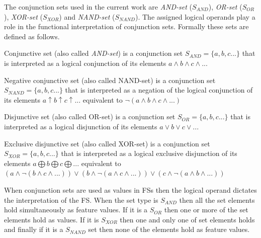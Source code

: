     The conjunction sets used in the current work are \textit{AND-set} ($S_{AND}$), \textit{OR-set} ($S_{OR}$), \textit{XOR-set} ($S_{XOR}$) and \textit{NAND-set} ($S_{NAND}$). The assigned logical operands play a role in the functional interpretation of conjunction sets. %
    Formally these sets are defined as follows.

    \begin{definition}\label{def:and-set}
      Conjunctive set (also called \textit{AND-set}) is a conjunction set $S_{AND}=\{a,b,c...\}$ that is interpreted as a logical conjunction of its elements $a \wedge b \wedge c \wedge ...$ 
    \end{definition}

    \begin{definition}\label{def:nand-set}
    	Negative conjunctive set (also called NAND-set) is a conjunction set $S_{NAND}=\{a,b,c...\}$ that is interpreted as a negation of the logical conjunction of its elements $a \uparrow b \uparrow c \uparrow ...$ equivalent to $ \neg(a \wedge b \wedge c \wedge ...)$ 
    \end{definition}

    \begin{definition}\label{def:or-set}
    	Disjunctive set (also called OR-set) is a conjunction set $S_{OR}=\{a,b,c...\}$ that is interpreted as a logical disjunction of its elements $a \vee b \vee c \vee ...$
    \end{definition}

    \begin{definition}\label{def:xor-set}
    	Exclusive disjunctive set (also called XOR-set) is a conjunction set $S_{XOR}=\{a,b,c...\}$ that is interpreted as a logical exclusive disjunction of its elements $a \bigoplus b \bigoplus c \bigoplus ...$ equivalent to $ (a \wedge \neg (b \wedge c \wedge ... )) \vee (b \wedge \neg (a \wedge c \wedge ...)) \vee (c \wedge \neg (a \wedge b \wedge ...)) $
    \end{definition}

    When conjunction sets are used as values in FSs then the logical operand dictates the interpretation of the FS. When the set type is $S_{AND}$ then all the set elements hold simultaneously as feature values. If it is a $S_{OR}$ then one or more of the set elements hold as values. If it is $S_{XOR}$ then one and only one of set elements holds and finally if it is a $S_{NAND}$ set then none of the elements hold as feature values.

